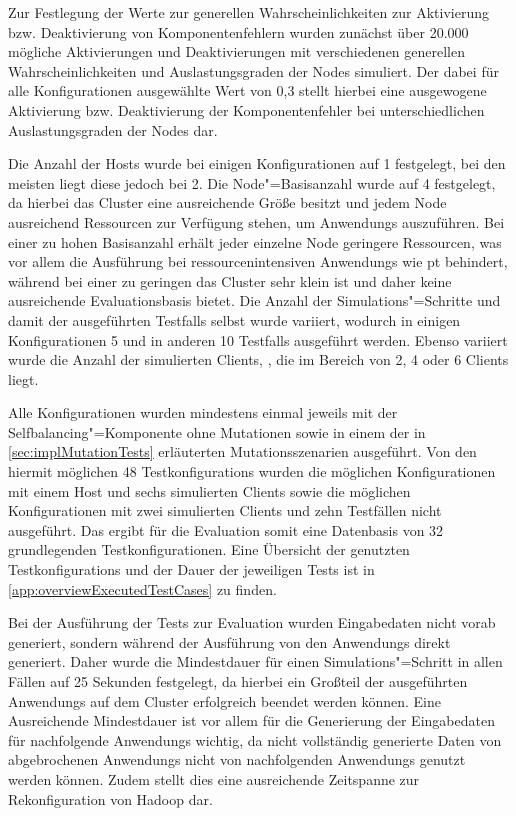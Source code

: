 Zur Festlegung der Werte zur generellen Wahrscheinlichkeiten zur Aktivierung bzw. Deaktivierung von Komponentenfehlern wurden zunächst über 20.000 mögliche Aktivierungen und Deaktivierungen mit verschiedenen generellen Wahrscheinlichkeiten und Auslastungsgraden der Nodes simuliert.
Der dabei für alle Konfigurationen ausgewählte Wert von 0,3 stellt hierbei eine ausgewogene Aktivierung bzw. Deaktivierung der Komponentenfehler bei unterschiedlichen Auslastungsgraden der Nodes dar.

Die Anzahl der Hosts wurde bei einigen Konfigurationen auf 1 festgelegt, bei den meisten liegt diese jedoch bei 2.
Die Node"=Basisanzahl wurde auf 4 festgelegt, da hierbei das Cluster eine ausreichende Größe besitzt und jedem Node ausreichend Ressourcen zur Verfügung stehen, um \glspl{Anwendung} auszuführen.
Bei einer zu hohen Basisanzahl erhält jeder einzelne Node geringere Ressourcen, was vor allem die Ausführung bei ressourcenintensiven \glspl{Anwendung} wie \zB \acrlong{pt} behindert, während bei einer zu geringen das Cluster sehr klein ist und daher keine ausreichende Evaluationsbasis bietet.
Die Anzahl der Simulations"=Schritte und damit der ausgeführten \glspl{Testfall} selbst wurde variiert, wodurch in einigen Konfigurationen 5 und in anderen 10 \glspl{Testfall} ausgeführt werden.
Ebenso variiert wurde die Anzahl der simulierten Clients, , die im Bereich von 2, 4 oder 6 Clients liegt.

Alle Konfigurationen wurden mindestens einmal jeweils mit der Selfbalancing"=Komponente ohne Mutationen sowie in einem der in \cref{sec:implMutationTests} erläuterten Mutationsszenarien ausgeführt.
Von den hiermit möglichen 48 \glspl{Testkonfiguration} wurden die möglichen Konfigurationen mit einem Host und sechs simulierten Clients sowie die möglichen Konfigurationen mit zwei simulierten Clients und zehn Testfällen nicht ausgeführt.
Das ergibt für die Evaluation somit eine Datenbasis von 32 grundlegenden Testkonfigurationen.
Eine Übersicht der genutzten \glspl{Testkonfiguration} und der Dauer der jeweiligen \glspl{Test} ist in \cref{app:overviewExecutedTestCases} zu finden.

Bei der Ausführung der \glspl{Test} zur Evaluation wurden Eingabedaten nicht vorab generiert, sondern während der Ausführung von den \glspl{Anwendung} direkt generiert.
Daher wurde die Mindestdauer für einen Simulations"=Schritt in allen Fällen auf 25 Sekunden festgelegt, da hierbei ein Großteil der ausgeführten \glspl{Anwendung} auf dem Cluster erfolgreich beendet werden können.
Eine Ausreichende Mindestdauer ist vor allem für die Generierung der Eingabedaten für nachfolgende \glspl{Anwendung} wichtig, da nicht vollständig generierte Daten von abgebrochenen \glspl{Anwendung} nicht von nachfolgenden \glspl{Anwendung} genutzt werden können.
Zudem stellt dies eine ausreichende Zeitspanne zur Rekonfiguration von Hadoop dar.

